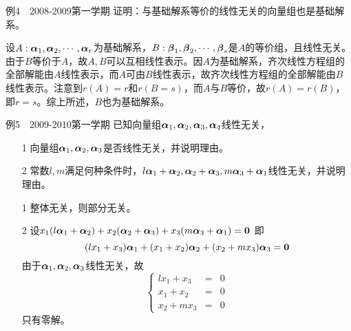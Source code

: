 \begin{frame}\ft{\subsecname}
  \begin{footnotesize}
    \begin{exampleblock}{例4~~2008-2009第一学期}
      证明：与基础解系等价的线性无关的向量组也是基础解系。
    \end{exampleblock}
    \pause\proofname
    设$A:\boldsymbol{\alpha}_1,\boldsymbol{\alpha}_2,\cdots,\boldsymbol{\alpha}_r$为基础解系，$B:\boldsymbol{\beta}_1,\boldsymbol{\beta}_2,\cdots,\boldsymbol{\beta}_s$是$A$的等价组，且线性无关。
    由于$B$等价于$A$，故$A,B$可以互相线性表示。因$A$为基础解系，齐次线性方程组的全部解能由$A$线性表示，而$A$可由$B$线性表示，故齐次线性方程组的全部解能由$B$线性表示。注意到$r(A)=r$和$r(B=s)$，而$A$与$B$等价，故$r(A)=r(B)$，即$r=s$。综上所述，$B$也为基础解系。
  \end{footnotesize}
\end{frame}


\begin{frame}\ft{\subsecname}
  \begin{footnotesize}
    \begin{exampleblock}{例5~~2009-2010第一学期}
      已知向量组$\boldsymbol{\alpha}_1,\boldsymbol{\alpha}_2,\boldsymbol{\alpha}_3,\boldsymbol{\alpha}_4$线性无关，
      \begin{itemize}
      \item[1] 向量组$\boldsymbol{\alpha}_1,\boldsymbol{\alpha}_2,\boldsymbol{\alpha}_3$是否线性无关，并说明理由。
      \item[2] 常数$l,m$满足何种条件时，$l\boldsymbol{\alpha}_1+\boldsymbol{\alpha}_2,\boldsymbol{\alpha}_2+\boldsymbol{\alpha}_3,m\boldsymbol{\alpha}_3+\boldsymbol{\alpha}_1$线性无关，并说明理由。
      \end{itemize}
    \end{exampleblock}
    \pause \proofname
    \begin{itemize}
      \item[1] 整体无关，则部分无关。
      \item[2]   
      设$
      x_1(l\boldsymbol{\alpha}_1+\boldsymbol{\alpha}_2)+x_2(\boldsymbol{\alpha}_2+\boldsymbol{\alpha}_3)+x_3(m\boldsymbol{\alpha}_3+\boldsymbol{\alpha}_1)=\mathbf{0}  
      $
      即
      $$
      (lx_1+x_3)\boldsymbol{\alpha}_1+(x_1+x_2)\boldsymbol{\alpha}_2 +(x_2+mx_3)\boldsymbol{\alpha}_3=\mathbf{0}
      $$      
      由于$\boldsymbol{\alpha}_1,\boldsymbol{\alpha}_2,\boldsymbol{\alpha}_3$线性无关，故
      $$
      \left\{
      \begin{array}{rcl}
lx_1+x_3&=&0\\
x_1+x_2&=&0\\
x_2+mx_3&=&0
      \end{array}
      \right.
      $$
      只有零解。
      \end{itemize}
  \end{footnotesize}
\end{frame}




